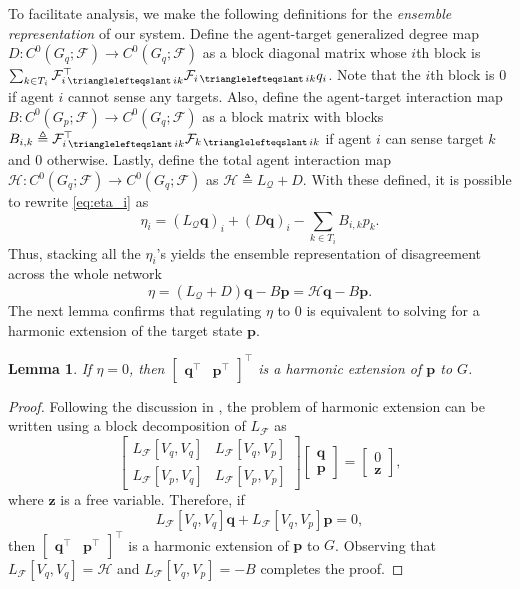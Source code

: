 \documentclass[letterpaper, 10 pt, conference]{ieeeconf}
\newcommand{\maps}{\colon}
\newcommand{\FF}{\mathcal{F}}
\DeclareMathOperator{\face}{\trianglelefteqslant}
\newtheorem{lemma}{Lemma}
\theoremstyle{definition}
\begin{document}
To facilitate analysis, we make the following definitions for the \emph{ensemble representation} of our system. 
Define the agent-target generalized degree map $D\maps C^0(G_q;\FF)\to C^0(G_q;\FF)$ as a block diagonal matrix whose $i$th block is $\sum_{k\in T_i}\FF^\top_{i\face ik}\FF_{i\face ik}q_i$.
Note that the $i$th block is 0 if agent $i$ cannot sense any targets.
Also, define the agent-target interaction map $B\maps C^0(G_p;\FF)\to C^0(G_q;\FF)$ as a block matrix with blocks $B_{i,k}\triangleq \FF_{i\face ik}^\top\FF_{k\face ik}$ if agent $i$ can sense target $k$ and 0 otherwise. Lastly, define the total agent interaction map $\mathcal{H}\maps C^0(G_q;\FF)\to C^0(G_q;\FF)$ as $\mathcal{H}\triangleq L_\mathcal{Q} + D$.
With these defined, it is possible to rewrite \eqref{eq:eta_i} as
\[
\eta_i = (L_\mathcal{Q}\mathbf{q})_i + (D\mathbf{q})_i - \sum_{k\in T_i}B_{i,k}p_k.
\]
Thus, stacking all the $\eta_i$'s yields the ensemble representation of disagreement across the whole network
\begin{equation}\label{eta1}
\eta = (L_\mathcal{Q} + D)\mathbf{q} - B\mathbf{p} = \mathcal{H}\mathbf{q} - B\mathbf{p}.
\end{equation}
The next lemma confirms that regulating $\eta$ to 0 is equivalent to solving for a harmonic extension of the target state $\mathbf{p}$.
\begin{lemma}\label{lem:eta0_harmonic}
    If $\eta=0$, then $\begin{bmatrix}
        \mathbf{q}^\top & \mathbf{p}^\top
    \end{bmatrix}^\top$ is a harmonic extension of $\mathbf{p}$ to $G$.
\end{lemma}
\begin{proof}
    Following the discussion in \cite[Section 3.1]{Hansen.Jakob2020a}, the problem of harmonic extension can be written using a block decomposition of $L_\FF$ as
    \[
    \begin{bmatrix}
    L_\FF[V_q,V_q] & L_\FF[V_q, V_p] \\ L_\FF[V_p, V_q] & L_\FF[V_p, V_p]
    \end{bmatrix}
    \begin{bmatrix}
        \mathbf{q}\\\mathbf{p}
    \end{bmatrix} = \begin{bmatrix}
        0\\\mathbf{z}
    \end{bmatrix},
    \]
    where $\mathbf{z}$ is a free variable. Therefore, if
    \[
    L_\FF[V_q,V_q]\mathbf{q} + L_\FF[V_q, V_p]\mathbf{p} = 0,
    \]
    then $\begin{bmatrix}
        \mathbf{q}^\top & \mathbf{p}^\top
    \end{bmatrix}^\top$ is a harmonic extension of $\mathbf{p}$ to $G$. Observing that $L_\FF[V_q,V_q] = \mathcal{H}$ and $L_\mathcal{F}[V_q, V_p]= -B$ completes the proof.
\end{proof}
\end{document}
